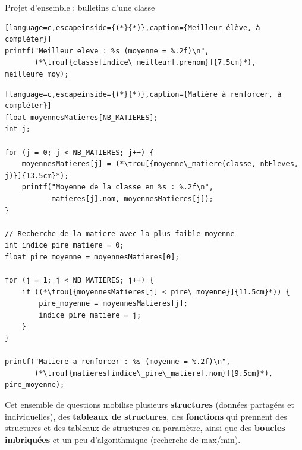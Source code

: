 \begin{UPSTIexercice}{Projet d'ensemble : bulletins d'une classe}
\begin{lstlisting}[language=c,escapeinside={(*}{*)},caption={Meilleur élève, à compléter}]
printf("Meilleur eleve : %s (moyenne = %.2f)\n",
       (*\trou[{classe[indice\_meilleur].prenom}]{7.5cm}*), meilleure_moy);
\end{lstlisting}



\begin{lstlisting}[language=c,escapeinside={(*}{*)},caption={Matière à renforcer, à compléter}]
float moyennesMatieres[NB_MATIERES];
int j;

for (j = 0; j < NB_MATIERES; j++) {
    moyennesMatieres[j] = (*\trou[{moyenne\_matiere(classe, nbEleves, j)}]{13.5cm}*);
    printf("Moyenne de la classe en %s : %.2f\n",
           matieres[j].nom, moyennesMatieres[j]);
}

// Recherche de la matiere avec la plus faible moyenne
int indice_pire_matiere = 0;
float pire_moyenne = moyennesMatieres[0];

for (j = 1; j < NB_MATIERES; j++) {
    if ((*\trou[{moyennesMatieres[j] < pire\_moyenne}]{11.5cm}*)) {
        pire_moyenne = moyennesMatieres[j];
        indice_pire_matiere = j;
    }
}

printf("Matiere a renforcer : %s (moyenne = %.2f)\n",
       (*\trou[{matieres[indice\_pire\_matiere].nom}]{9.5cm}*), pire_moyenne);
\end{lstlisting}

    Cet ensemble de questions mobilise plusieurs \textbf{structures} (données partagées et individuelles),
    des \textbf{tableaux de structures}, des \textbf{fonctions} qui prennent des structures et des tableaux
    de structures en paramètre, ainsi que des \textbf{boucles imbriquées} et un peu d'algorithmique
    (recherche de max/min).
\end{UPSTIexercice}


